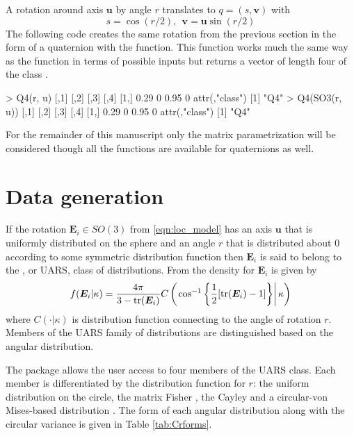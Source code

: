 A rotation around axis $\bm u$ by angle $r$ translates to $q=(s,\bm v)$ with
\[
s = \cos{(r/2)},  \ \ \bm v = \bm u \sin {(r/2)}
\]
The following code creates the same rotation from the previous section in the form of a quaternion with the  function.  This function works much the same way as the  function in terms of possible inputs but returns a vector of length four of the class . 

\begin{example}
> Q4(r, u)
     [,1] [,2] [,3]  [,4]
[1,] 0.29    0 0.95     0
attr(,"class")
[1] "Q4"
> Q4(SO3(r, u))
     [,1] [,2] [,3]  [,4]
[1,] 0.29    0 0.95     0
attr(,"class")
[1] "Q4"
\end{example}


For the remainder of this manuscript only the matrix parametrization will be considered though all the functions are available for quaternions as well.

\section{Data generation\label{section:generation}} 

If the rotation $\bm{E}_i\in SO(3)$ from \eqref{eqn:loc_model} has an axis $\bm u$ that is uniformly distributed on the sphere and an angle $r$ that is distributed about $0$ according to some symmetric distribution function then $\bm E_i$ is said to belong to the , or UARS, class of distributions.   From \cite{bingham2009} the density for $\bm E_i$ is given by
\begin{equation}\label{eq:uarsden}
f(\bm E_i|\kappa)=\frac{4\pi}{3-\text{tr}(\bm E_i)}C\left(\left.\cos^{-1}\left\{\frac{1}{2}[\text{tr}(\bm E_i)-1]\right\}\right|\kappa\right)
\end{equation}
where $C(\cdot|\kappa)$ is distribution function connecting to the angle of rotation $r$.  Members of the UARS family of distributions are distinguished based on the angular distribution.


The  package allows the user access to four members of the UARS class.  Each member is differentiated by the distribution function for $r$: the uniform distribution on the circle, the matrix Fisher \citep{langevin2005, downs1972, khatri1977, jupp1979}, the Cayley  \citep{Schaeben1997, leon2006} and a circular-von Mises-based distribution \citep{bingham2009}.   The form of each angular distribution along with the circular variance is given in Table \ref{tab:Crforms}.


